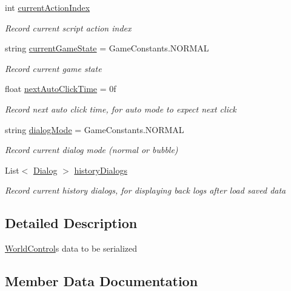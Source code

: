 \begin{DoxyCompactItemize}
int \hyperlink{classdoki_unity_1_1_world_control_data_ae134b545efc5faa2da90e10e381dcfcc}{current\+Action\+Index}
\begin{DoxyCompactList}\small\item\em Record current script action index \end{DoxyCompactList}\item 
string \hyperlink{classdoki_unity_1_1_world_control_data_aaa9ed37dc517186250f972d7604f771c}{current\+Game\+State} = Game\+Constants.\+N\+O\+R\+M\+AL
\begin{DoxyCompactList}\small\item\em Record current game state \end{DoxyCompactList}\item 
float \hyperlink{classdoki_unity_1_1_world_control_data_a562371219297ea2089b6a85ba35cb08e}{next\+Auto\+Click\+Time} = 0f
\begin{DoxyCompactList}\small\item\em Record next auto click time, for auto mode to expect next click \end{DoxyCompactList}\item 
string \hyperlink{classdoki_unity_1_1_world_control_data_ab53a46142e7f6a0755e45a9a8207722e}{dialog\+Mode} = Game\+Constants.\+N\+O\+R\+M\+AL
\begin{DoxyCompactList}\small\item\em Record current dialog mode (normal or bubble) \end{DoxyCompactList}\item 
List$<$ \hyperlink{classdoki_unity_1_1_dialog}{Dialog} $>$ \hyperlink{classdoki_unity_1_1_world_control_data_ac7a3b1ed4fb548aca66bc6b2693b772c}{history\+Dialogs}
\begin{DoxyCompactList}\small\item\em Record current history dialogs, for displaying back logs after load saved data \end{DoxyCompactList}\end{DoxyCompactItemize}


\subsection{Detailed Description}
\hyperlink{classdoki_unity_1_1_world_control}{World\+Control}\textquotesingle{}s data to be serialized 



\subsection{Member Data Documentation}
